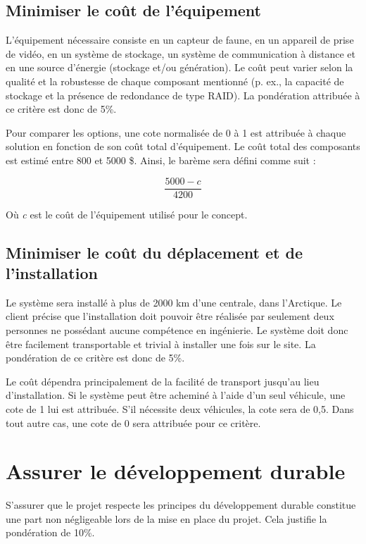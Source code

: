 \subsection{Minimiser le coût de l'équipement}

L’équipement nécessaire consiste en un capteur de faune, en un appareil de
prise de vidéo, en un système de stockage, un système de communication à
distance et en une source d’énergie (stockage et/ou génération). Le coût peut
varier selon la qualité et la robustesse de chaque composant mentionné (p. ex.,
la capacité de stockage et la présence de redondance de type RAID). La
pondération attribuée à ce critère est donc de 5\%.

Pour comparer les options, une cote normalisée de 0 à 1 est attribuée à chaque
solution en fonction de son coût total d’équipement. Le coût total des
composants est estimé entre 800 et 5000 \$. Ainsi, le barème sera défini comme
suit :

\begin{equation}
  \frac{5000 - c}{4200}
\end{equation}

Où \textit{c} est le coût de l’équipement utilisé pour le concept.

\subsection{Minimiser le coût du déplacement et de l’installation}

Le système sera installé à plus de 2000 km d’une centrale, dans l’Arctique. Le
client précise que l’installation doit pouvoir être réalisée par seulement deux
personnes ne possédant aucune compétence en ingénierie. Le système doit donc
être facilement transportable et trivial à installer une fois sur le site. La
pondération de ce critère est donc de 5\%.

Le coût dépendra principalement de la facilité de transport jusqu’au lieu
d’installation. Si le système peut être acheminé à l’aide d’un seul véhicule,
une cote de 1 lui est attribuée. S’il nécessite deux véhicules, la cote sera de
0,5. Dans tout autre cas, une cote de 0 sera attribuée pour ce critère.

\section{Assurer le développement durable}

S’assurer que le projet respecte les principes du développement durable
constitue une part non négligeable lors de la mise en place du projet. Cela
justifie la pondération de 10\%.

